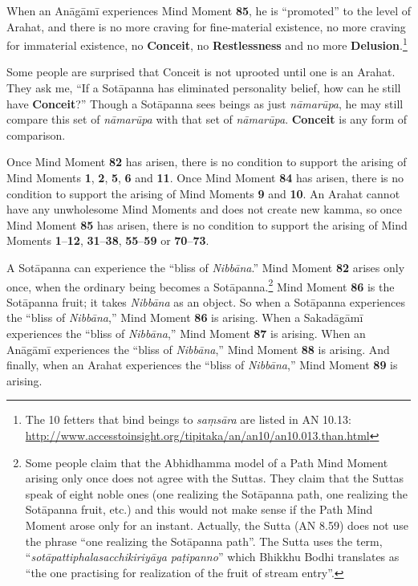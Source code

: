 When an Anāgāmī experiences Mind Moment \textbf{85}, he is “promoted” to the level of Arahat, and there is no more craving for fine-material existence, no more craving for immaterial existence, no \textbf{Conceit}, no \textbf{Restlessness} and no more \textbf{Delusion}.\footnote{The 10 fetters that bind beings to \textit{saṃsāra} are listed in AN 10.13: \url{http://www.accesstoinsight.org/tipitaka/an/an10/an10.013.than.html}}

Some people are surprised that Conceit is not uprooted until one is an Arahat. They ask me, “If a Sotāpanna has eliminated personality belief, how can he still have \textbf{Conceit}?” Though a Sotāpanna sees beings as just \textit{nāmarūpa}, he may still compare this set of \textit{nāmarūpa} with that set of \textit{nāmarūpa}. \textbf{Conceit} is any form of comparison.

Once Mind Moment \textbf{82} has arisen, there is no condition to support the arising of Mind Moments \textbf{1}, \textbf{2}, \textbf{5}, \textbf{6} and \textbf{11}. Once Mind Moment \textbf{84} has arisen, there is no condition to support the arising of Mind Moments \textbf{9} and \textbf{10}. An Arahat cannot have any unwholesome Mind Moments and does not create new kamma, so once Mind Moment \textbf{85} has arisen, there is no condition to support the arising of Mind Moments \textbf{1}--\textbf{12}, \textbf{31}--\textbf{38}, \textbf{55}--\textbf{59} or \textbf{70}--\textbf{73}.

A Sotāpanna can experience the “bliss of \textit{Nibbāna}.” Mind Moment \textbf{82} arises only once, when the ordinary being becomes a Sotāpanna.\footnote{ Some people claim that the Abhidhamma model of a Path Mind Moment arising only once does not agree with the Suttas. They claim that the Suttas speak of eight noble ones (one realizing the Sotāpanna path, one realizing the Sotāpanna fruit, etc.) and this would not make sense if the Path Mind Moment arose only for an instant. Actually, the Sutta (AN 8.59) does not use the phrase “one realizing the Sotāpanna path”. The Sutta uses the term, “\textit{sotāpattiphalasacchikiriyāya paṭipanno}” which Bhikkhu Bodhi translates as “the one practising for realization of the fruit of stream entry”.} Mind Moment \textbf{86} is the Sotāpanna fruit; it takes \textit{Nibbāna} as an object. So when a Sotāpanna experiences the “bliss of \textit{Nibbāna},” Mind Moment \textbf{86} is arising. When a Sakadāgāmī experiences the “bliss of \textit{Nibbāna},” Mind Moment \textbf{87} is arising. When an Anāgāmī experiences the “bliss of \textit{Nibbāna},” Mind Moment \textbf{88} is arising. And finally, when an Arahat experiences the “bliss of \textit{Nibbāna},” Mind Moment \textbf{89} is arising. 

